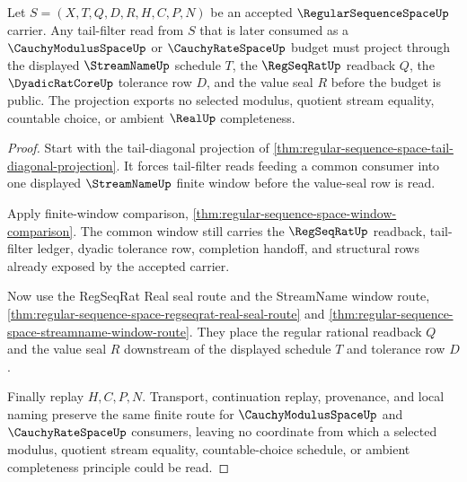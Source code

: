 \begin{theorem}
\label{thm:regular-sequence-space-tail-modulus-projection}
Let $S=(X,T,Q,D,R,H,C,P,N)$ be an accepted $\RegularSequenceSpaceUp$ carrier. Any tail-filter read from $S$ that is later consumed as a $\CauchyModulusSpaceUp$ or $\CauchyRateSpaceUp$ budget must project through the displayed $\StreamNameUp$ schedule $T$, the $\RegSeqRatUp$ readback $Q$, the $\DyadicRatCoreUp$ tolerance row $D$, and the value seal $R$ before the budget is public. The projection exports no selected modulus, quotient stream equality, countable choice, or ambient $\RealUp$ completeness.
\end{theorem}
\begin{proof}
Start with the tail-diagonal projection of \autoref{thm:regular-sequence-space-tail-diagonal-projection}. It forces tail-filter reads feeding a common consumer into one displayed $\StreamNameUp$ finite window before the value-seal row is read.

Apply finite-window comparison, \autoref{thm:regular-sequence-space-window-comparison}. The common window still carries the $\RegSeqRatUp$ readback, tail-filter ledger, dyadic tolerance row, completion handoff, and structural rows already exposed by the accepted carrier.

Now use the RegSeqRat Real seal route and the StreamName window route, \autoref{thm:regular-sequence-space-regseqrat-real-seal-route} and \autoref{thm:regular-sequence-space-streamname-window-route}. They place the regular rational readback $Q$ and the value seal $R$ downstream of the displayed schedule $T$ and tolerance row $D$.

Finally replay $H,C,P,N$. Transport, continuation replay, provenance, and local naming preserve the same finite route for $\CauchyModulusSpaceUp$ and $\CauchyRateSpaceUp$ consumers, leaving no coordinate from which a selected modulus, quotient stream equality, countable-choice schedule, or ambient completeness principle could be read.
\end{proof}

